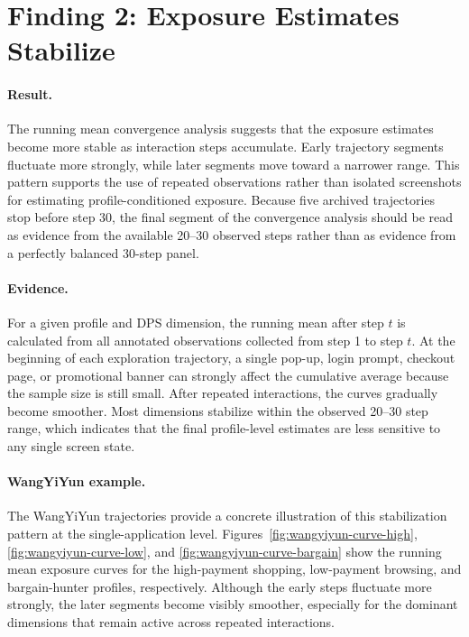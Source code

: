 \section{Finding 2: Exposure Estimates Stabilize}

\paragraph{Result.}
The running mean convergence analysis suggests that the exposure estimates become more stable as interaction steps accumulate. Early trajectory segments fluctuate more strongly, while later segments move toward a narrower range. This pattern supports the use of repeated observations rather than isolated screenshots for estimating profile-conditioned exposure. Because five archived trajectories stop before step 30, the final segment of the convergence analysis should be read as evidence from the available 20--30 observed steps rather than as evidence from a perfectly balanced 30-step panel.

\paragraph{Evidence.}
For a given profile and DPS dimension, the running mean after step $t$ is calculated from all annotated observations collected from step 1 to step $t$. At the beginning of each exploration trajectory, a single pop-up, login prompt, checkout page, or promotional banner can strongly affect the cumulative average because the sample size is still small. After repeated interactions, the curves gradually become smoother. Most dimensions stabilize within the observed 20--30 step range, which indicates that the final profile-level estimates are less sensitive to any single screen state.

\paragraph{WangYiYun example.}
The WangYiYun trajectories provide a concrete illustration of this stabilization pattern at the single-application level. Figures~\ref{fig:wangyiyun-curve-high}, \ref{fig:wangyiyun-curve-low}, and \ref{fig:wangyiyun-curve-bargain} show the running mean exposure curves for the high-payment shopping, low-payment browsing, and bargain-hunter profiles, respectively. Although the early steps fluctuate more strongly, the later segments become visibly smoother, especially for the dominant dimensions that remain active across repeated interactions.

